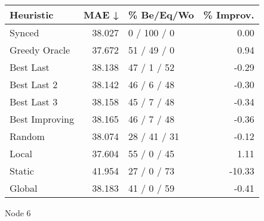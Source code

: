 \begin{tabular}{lrlr}
\toprule
\textbf{Heuristic} & \textbf{MAE ↓} & \textbf{\% Be/Eq/Wo} & \textbf{\% Improv.} \\
\midrule
            Synced &         38.027 &          0 / 100 / 0 &                0.00 \\
     Greedy Oracle &         37.672 &          51 / 49 / 0 &                0.94 \\
         Best Last &         38.138 &          47 / 1 / 52 &               -0.29 \\
       Best Last 2 &         38.142 &          46 / 6 / 48 &               -0.30 \\
       Best Last 3 &         38.158 &          45 / 7 / 48 &               -0.34 \\
    Best Improving &         38.165 &          46 / 7 / 48 &               -0.36 \\
            Random &         38.074 &         28 / 41 / 31 &               -0.12 \\
             Local &         37.604 &          55 / 0 / 45 &                1.11 \\
            Static &         41.954 &          27 / 0 / 73 &              -10.33 \\
            Global &         38.183 &          41 / 0 / 59 &               -0.41 \\
\bottomrule
\end{tabular}
\caption{Node 6}
\label{tab:non_lr01_le2_bs2_6}
